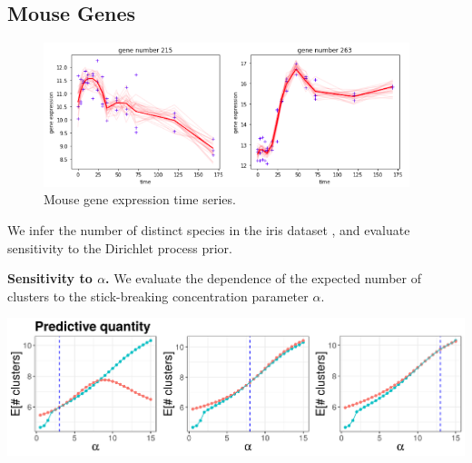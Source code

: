 \documentclass[a0,plainsections,30pt]{sciposter}\usepackage[]{graphicx}\usepackage[]{color}
\newenvironment{knitrout}{}{} %
\begin{document}
\begin{minipage}[t]{0.45\textwidth}
\begin{minipage}[t]{0.49\textwidth}
    \subsection*{Mouse Genes}
    \begin{figure}[!h]
    \centering
    \includegraphics[width = 0.95\textwidth]{./static_images/mouse_genes.png}
    \caption{Mouse gene expression time series.}
    \setlength{\textfloatsep}{-10pt}
    \end{figure}
\end{minipage}
We infer the number of distinct species in the iris
dataset \cite{iris_data_anderson}, and evaluate sensitivity to the Dirichlet process prior.
\vspace{0.1in}

{\bf \large Sensitivity to $\alpha$.}
We evaluate the dependence of the expected number of clusters to the stick-breaking concentration parameter $\alpha$.

\vspace{0.05in}
%

\begin{knitrout}
\color{fgcolor}

{\centering \includegraphics[width=0.98\linewidth,height=0.294\linewidth]{figure/param_sens_plot-1} 

}



\end{knitrout}


\end{minipage}
\end{document}

